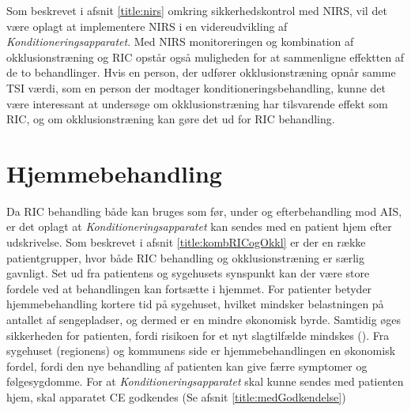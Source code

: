 Som beskrevet i afsnit \ref{title:nirs} omkring sikkerhedskontrol med NIRS, vil det være oplagt at implementere NIRS i en videreudvikling af \textit{Konditioneringsapparatet}. Med NIRS monitoreringen og kombination af okklusionstræning og RIC opstår også muligheden for at sammenligne effektten af de to behandlinger. Hvis en person, der udfører okklusionstræning opnår samme TSI værdi, som en person der modtager konditioneringsbehandling, kunne det være interessant at undersøge om okklusionstræning har tilsvarende effekt som RIC, og om okklusionstræning kan gøre det ud for RIC behandling. 

\section{Hjemmebehandling}\label{title:Hjemmebehandling}
Da RIC behandling både kan bruges som før, under og efterbehandling mod AIS, er det oplagt at \textit{Konditioneringsapparatet} kan sendes med en patient hjem efter udskrivelse. Som beskrevet i afsnit \ref{title:kombRICogOkkl} er der en række patientgrupper, hvor både RIC behandling og okklusionstræning er særlig gavnligt. Set ud fra patientens og sygehusets synspunkt kan der være store fordele ved at behandlingen kan fortsætte i hjemmet. For patienter betyder hjemmebehandling kortere tid på sygehuset, hvilket mindsker belastningen på antallet af sengepladser, og dermed er en mindre økonomisk byrde. Samtidig øges sikkerheden for patienten, fordi risikoen for et nyt slagtilfælde mindskes (\cite{RefWorks:20}). Fra sygehuset (regionens) og kommunens side er hjemmebehandlingen en økonomisk fordel, fordi den nye behandling af patienten kan give færre symptomer og følgesygdomme. 
For at \textit{Konditioneringsapparatet} skal kunne sendes med patienten hjem, skal apparatet CE godkendes (Se afsnit \ref{title:medGodkendelse})